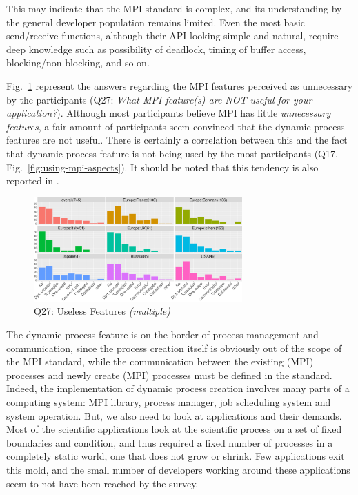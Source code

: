 \documentclass[preprint,5p,times]{elsarticle}
\def\myquote#1{{\it #1}}
\newcommand{\revision}[2]{{\color{blue}#2}}
\begin{document}
This may indicate that the MPI standard is complex, and its understanding by the
general developer population remains limited. Even the most basic send/receive
functions, although their API looking simple and natural, require deep knowledge
such as possibility of deadlock, timing of buffer access, blocking/non-blocking,
and so on.

Fig.~\ref{fig:useless-features} represent the answers regarding the MPI features
perceived as unnecessary by the participants (Q27: \myquote{What MPI feature(s)
are NOT useful for your application?}). Although most participants believe MPI
has little {\it unnecessary features}, a fair amount of participants seem
convinced that the dynamic process features are not useful. There is certainly a
correlation between this and the fact that dynamic process feature is not being
used by the most participants (Q17, Fig.~\ref{fig:using-mpi-aspects}). It should
be noted that this tendency is also reported in \cite{10.1145/3295500.3356176}.

\begin{figure}[tb]
  \begin{center}
    \includegraphics[width=8.0cm]{R-scripts/Q27.pdf}
    \vspace{-2mm}
    \caption{Q27: Useless Features {\it(multiple)}}
    \label{fig:useless-features}
  \end{center}
\end{figure}

The dynamic process feature is on the border of process management and
communication, since the process creation itself is obviously out of the scope
of the MPI standard, while the communication between the existing (MPI)
processes and newly create (MPI) processes must be defined in the standard.
Indeed, the implementation of dynamic process creation \revision{spreads}{involves} many parts of a
computing system: MPI library, process manager, job scheduling system and system
operation.
%
But, we also need to look at applications and their demands. Most of the
scientific applications look at the scientific process on a set of fixed
boundaries and condition, and thus required a fixed number of processes in a
completely static world, one that does not grow or shrink. Few applications exit
this mold, and the small number of developers working around these applications
seem to not have been reached by the survey.
\end{document}
